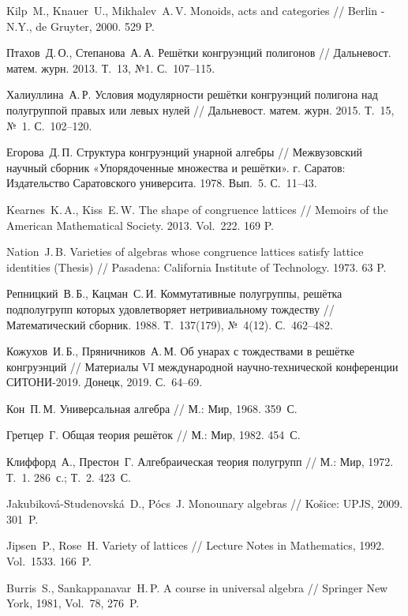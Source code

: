 \documentclass[11pt,twoside,final
]{article}
\begin{document}
\begin{thebibliography}{99}
	
	Kilp~M., Knauer~U., Mikhalev~A.\,V. Monoids, acts and categories // Berlin - N.Y., de Gruyter, 2000. 529 P.
	
	Птахов~Д.\,О., Степанова~А.\,А. Решётки конгруэнций полигонов // Дальневост. матем. журн. 2013. Т.~13, №1. С.~107--115.
	
	Халиуллина~А.\,Р. Условия модулярности решётки конгруэнций полигона над полугруппой правых или левых нулей // Дальневост. матем. журн. 2015. Т.~15, №~1. С.~102--120.
	
	Егорова~Д.\,П. Структура конгруэнций унарной алгебры // Межвузовский научный сборник «Упорядоченные множества и решётки». г. Саратов: Издательство Саратовского университа. 1978. Вып.~5. С.~11--43.
	
	Kearnes~K.\,A., Kiss~E.\,W. The shape of congruence lattices // Memoirs of the American Mathematical Society. 2013. Vol.~222. 169 P.
	
	Nation~J.\,B. Varieties of algebras whose congruence lattices satisfy lattice identities (Thesis) // Pasadena: California Institute of Technology. 1973. 63 P.
	
	Репницкий~В.\,Б., Кацман~С.\,И. Коммутативные полугруппы, решётка подполугрупп которых удовлетворяет нетривиальному тождеству // Математический сборник. 1988. Т.~137(179), №~4(12). С.~462--482.
	
	Кожухов~И.\,Б., Пряничников~А.\,М. Об унарах с тождествами в решётке конгруэнций // Материалы VI международной научно-технической конференции СИТОНИ-2019. Донецк, 2019. С.~64--69.
	
	Кон~П.\,М. Универсальная алгебра // М.: Мир, 1968. 359~С.
	
	Гретцер~Г. Общая теория решёток // М.: Мир, 1982. 454~С.
	
	Клиффорд~А., Престон~Г. Алгебраическая теория полугрупп // М.: Мир, 1972. Т.~1. 286~с.; Т.~2. 423~С.
	
	Jakubiková-Studenovská~D., Pócs~J. Monounary algebras // Košice: UPJS, 2009. 301~P.
	
	Jipsen~P., Rose~H. Variety of lattices // Lecture Notes in Mathematics, 1992. Vol.~1533. 166~P.
	
	Burris~S., Sankappanavar~H.\,P. A course in universal algebra // Springer New York, 1981, Vol.~78, 276~P.
	
\end{thebibliography}
\end{document}
